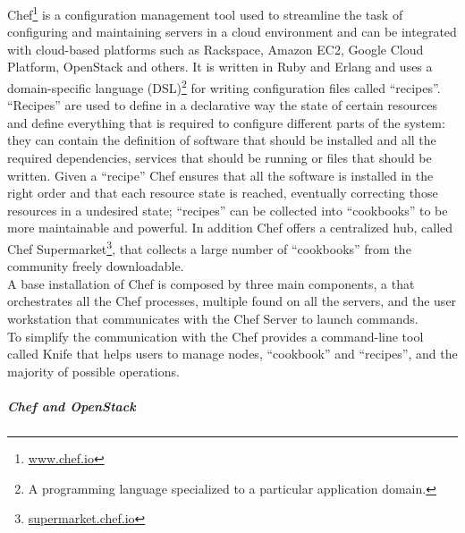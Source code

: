 Chef\footnote{\url{www.chef.io}} is a configuration management tool used to streamline the task of configuring and maintaining servers in a cloud environment and can be integrated with cloud-based platforms such as Rackspace, Amazon EC2, Google Cloud Platform, OpenStack and others. It is written in Ruby and Erlang and uses a domain-specific language (DSL)\footnote{A programming language specialized to a particular application domain.} for writing configuration files called ``recipes''. ``Recipes'' are used to define in a declarative way the state of certain resources and define everything that is required to configure different parts of the system: they can contain the definition of software that should be installed and all the required dependencies, services that should be running or files that should be written. Given a ``recipe'' Chef ensures that all the software is installed in the right order and that each resource state is reached, eventually correcting those resources in a undesired state; ``recipes'' can be collected into ``cookbooks'' to be more maintainable and powerful. In addition Chef offers a centralized hub, called Chef Supermarket\footnote{\url{supermarket.chef.io}}, that collects a large number of ``cookbooks'' from the community freely downloadable.\\
A base installation of Chef is composed by three main components, a  that orchestrates all the Chef processes, multiple  found on all the servers, and the user workstation that communicates with the Chef Server to launch commands.\\
To simplify the communication with the  Chef provides a command-line tool called Knife that helps users to manage nodes, ``cookbook'' and ``recipes'', and the majority of possible operations.

\subparagraph{Chef and OpenStack}
\label{subp:sota_chef_openstack}

